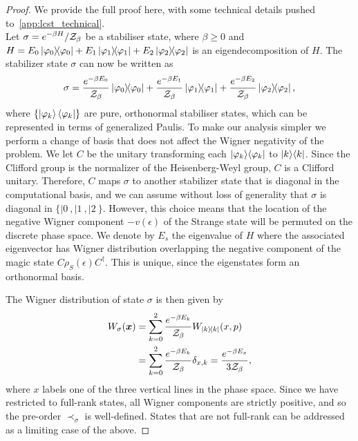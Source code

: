 \documentclass[pra,
aps,
twocolumn,
superscriptaddress,
groupedaddress,
nofootinbib,
reprint
]{revtex4-1}
\begin{document}
\begin{proof}
	We provide the full proof here, with some technical details pushed to~\cref{app:lcst_technical}.\\

Let $\displaystyle \sigma = e^{-\beta H} / \mathcal{Z}_\beta$ be a stabiliser state, where $\beta \geq 0$ and $H = E_0 \ketbra{\varphi_0} + E_1 \ketbra{\varphi_1} + E_2 \ketbra{\varphi_2}$ is an eigendecomposition of $H$.
The stabilizer state $\sigma$ can now be written as 
\begin{equation}
	\sigma = \frac{e^{-\beta E_0}}{\mathcal{Z}_\beta} \ketbra{\varphi_0} + \frac{e^{-\beta E_1}}{\mathcal{Z}_\beta} \ketbra{\varphi_1} + \frac{e^{-\beta E_2}}{\mathcal{Z}_\beta} \ketbra{\varphi_2},
\end{equation}
where $\{\ket{\varphi_k}\langle\varphi_k|\}$ are pure, orthonormal stabiliser states, which can be represented in terms of generalized Paulis. To make our analysis simpler we perform a change of basis that does not affect the Wigner negativity of the problem. We let $C$ be the unitary transforming each $|\varphi_k\rangle\langle\varphi_k|$ to $|k\rangle\langle k|$. Since the Clifford group is the normalizer of the Heisenberg-Weyl group, $C$ is a Clifford unitary. Therefore, $C$ maps $\sigma$ to another stabilizer state that is diagonal in the computational basis, and we can assume without loss of generality that $\sigma$ is diagonal in $\{|0\>,|1\>, |2\>\}$. However, this choice means that the location of the negative Wigner component $-v(\epsilon)$ of the Strange state will be permuted on the discrete phase space. We denote by $E_s$ the eigenvalue of $H$ where the associated eigenvector has Wigner distribution overlapping the negative component of the magic state $C\rho_S(\epsilon)C^\dagger$.  This is unique, since the eigenstates form an orthonormal basis.

The Wigner distribution of state $\sigma$ is then given by
\begin{align}
	\W[\bmx]{\sigma} &= \sum\limits_{k=0}^2 \frac{e^{-\beta E_k}}{\Z_\beta}W_{\ketbra{k}}(x, p) \nonumber\\
	&= \sum\limits_{k=0}^2 \frac{e^{-\beta E_k}}{\Z_\beta} \delta_{x, k} = \frac{e^{-\beta E_x}}{3\Z_\beta},
\end{align}
where $x$ labels one of the three vertical lines in the phase space.
Since we have restricted to full-rank states, all Wigner components are strictly positive, and so the pre-order $\prec_{\sigma}$ is well-defined. States that are not full-rank can be addressed as a limiting case of the above.


\end{proof}
\end{document}
